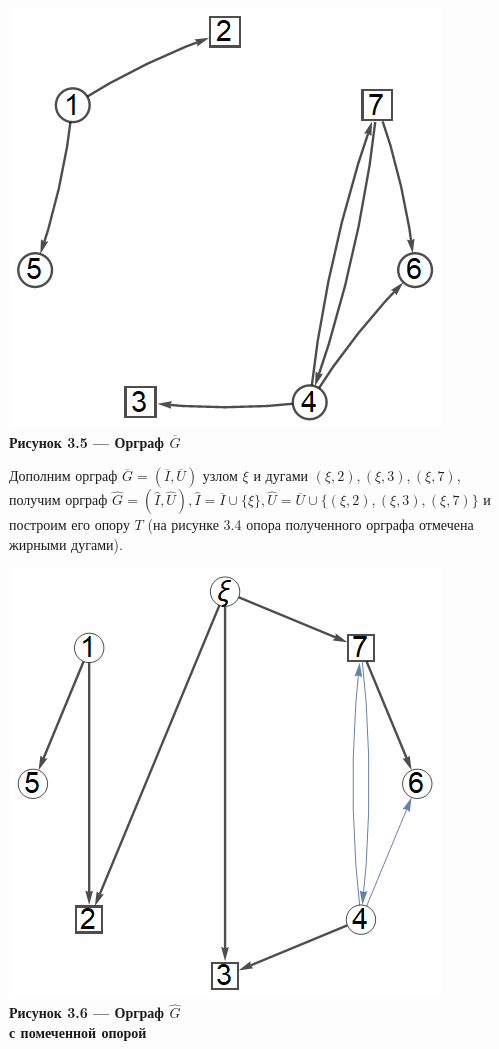 \documentclass[14pt]{extarticle}%
\begin{document}
\begin{center}
\includegraphics[scale=0.5]{grs/s2overg.png}\\
\textbf{Рисунок 3.5 --- Орграф $\overline{G}$}
\end{center}

Дополним орграф $\overline{G}=(\overline{I},\overline{U})$ узлом $\xi$ и дугами $(\xi,2), (\xi,3), (\xi,7)$, получим орграф $\widehat{G}=(\widehat{I}, \widehat{U}), \widehat{I}=\overline{I}\cup \{\xi\}, \widehat{U}=\overline{U}\cup \{(\xi,2), (\xi,3), (\xi,7)\}$ и построим его опору $T$ (на рисунке 3.4 опора полученного орграфа отмечена жирными дугами).

\begin{center}
\includegraphics[scale=0.5]{grs/s2ghat.png}\\
\textbf{Рисунок 3.6 --- Орграф $\widehat{G}$ \\с помеченной опорой}
\end{center}
\end{document}
